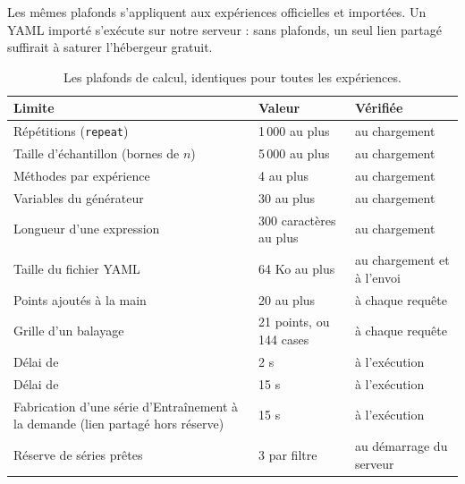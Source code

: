 \documentclass[11pt,a4paper]{article}
\begin{document}
Les mêmes plafonds s'appliquent aux expériences officielles et importées. Un YAML importé s'exécute sur notre serveur : sans plafonds, un seul lien partagé suffirait à saturer l'hébergeur gratuit.

\begin{table}[H]
  \centering
  \small
  \begin{tabularx}{\textwidth}{@{}Y L{4.2cm} L{4.4cm}@{}}
    \toprule
    \textbf{Limite} & \textbf{Valeur} & \textbf{Vérifiée} \\
    \midrule
    Répétitions (\texttt{repeat}) & 1\,000 au plus & au chargement \\
    Taille d'échantillon (bornes de $n$) & 5\,000 au plus & au chargement \\
    Méthodes par expérience & 4 au plus & au chargement \\
    Variables du générateur & 30 au plus & au chargement \\
    Longueur d'une expression & 300 caractères au plus & au chargement \\
    Taille du fichier YAML & 64 Ko au plus & au chargement et à l'envoi \\
    Points ajoutés à la main & 20 au plus & à chaque requête \\
    Grille d'un balayage & 21 points, ou 144 cases & à chaque requête \\
    Délai de  & 2 s & à l'exécution \\
    Délai de  & 15 s & à l'exécution \\
    Fabrication d'une série d'Entraînement à la demande (lien partagé hors réserve) & 15 s & à l'exécution \\
    Réserve de séries prêtes & 3 par filtre & au démarrage du serveur \\
    \bottomrule
  \end{tabularx}
  \caption{Les plafonds de calcul, identiques pour toutes les expériences.}
\end{table}
\end{document}
